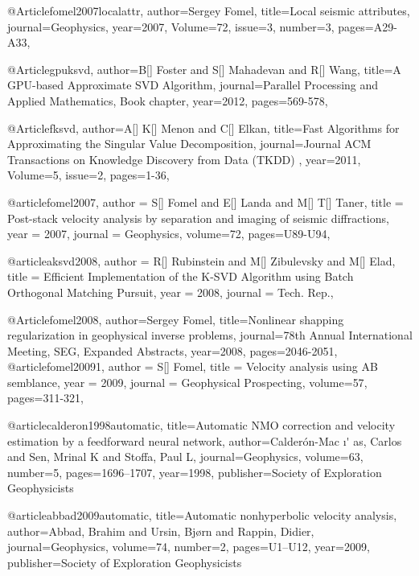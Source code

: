@Article{fomel2007localattr,
  author={Sergey Fomel},
  title={Local seismic attributes},
  journal={Geophysics},
  year=2007,
  Volume=72,
  issue=3,
  number=3,
  pages={A29-A33},
}

@Article{gpuksvd,
  author={B[] Foster and S[] Mahadevan and R[] Wang},
  title={A {GPU}-based Approximate {SVD} Algorithm},
  journal={Parallel Processing and Applied Mathematics, Book chapter},
  year=2012,
  pages={569-578},
}

@Article{fksvd,
  author={A[] K[] Menon and C[] Elkan},
  title={Fast Algorithms for Approximating the Singular Value Decomposition},
  journal={Journal ACM Transactions on Knowledge Discovery from Data (TKDD) },
  year=2011,
  Volume=5,
  issue=2,
  pages={1-36},
}






@article{fomel2007,
  author =	 {S[] Fomel and E[] Landa and M[] T[] Taner},
  title =	 {Post-stack velocity analysis by separation and imaging of seismic diffractions},
  year =	 2007,
  journal =	 {Geophysics},
  volume={72},
 pages=U89-U94,
}

@article{aksvd2008,
  author =	 {R[] Rubinstein and M[] Zibulevsky and M[] Elad},
  title =	 {Efficient Implementation of the {K-SVD} Algorithm using Batch Orthogonal Matching Pursuit},
  year =	 2008,
  journal =	 {Tech. Rep.},
}

@Article{fomel2008,
  author={Sergey Fomel},
  title={Nonlinear shapping regularization in geophysical inverse problems},
  journal={78th Annual International Meeting, SEG, Expanded Abstracts},
  year=2008,
  pages={2046-2051},
}
@article{fomel20091,
  author =	 {S[] Fomel},
  title =	 {Velocity analysis using {AB} semblance},
  year =	 2009,
  journal =	 {Geophysical Prospecting},
  volume={57},
 pages=311-321,
}

@article{calderon1998automatic,
  title={Automatic NMO correction and velocity estimation by a feedforward neural network},
  author={Calder{\'o}n-Mac {\i}{\'{}} as, Carlos and Sen, Mrinal K and Stoffa, Paul L},
  journal={Geophysics},
  volume={63},
  number={5},
  pages={1696--1707},
  year={1998},
  publisher={Society of Exploration Geophysicists}
}

@article{abbad2009automatic,
  title={Automatic nonhyperbolic velocity analysis},
  author={Abbad, Brahim and Ursin, Bj{\o}rn and Rappin, Didier},
  journal={Geophysics},
  volume={74},
  number={2},
  pages={U1--U12},
  year={2009},
  publisher={Society of Exploration Geophysicists}
}

